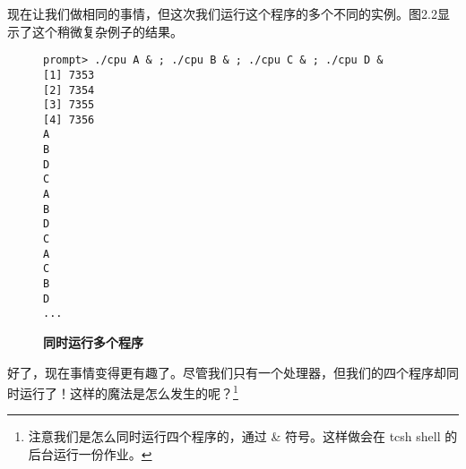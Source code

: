 现在让我们做相同的事情，但这次我们运行这个程序的多个不同的实例。图2.2显示了这个稍微复杂例子的结果。

\begin{figure}[ht]
\begin{verbatim}
prompt> ./cpu A & ; ./cpu B & ; ./cpu C & ; ./cpu D &
[1] 7353
[2] 7354
[3] 7355
[4] 7356
A
B
D
C
A
B
D
C
A
C
B
D
...
\end{verbatim}
\caption{\textbf{同时运行多个程序}}
\end{figure}

好了，现在事情变得更有趣了。尽管我们只有一个处理器，但我们的四个程序却同时运行了！这样的魔法是怎么发生的呢？\footnote{注意我们是怎么同时运行四个程序的，通过 \& 符号。这样做会在 tcsh shell 的后台运行一份作业。}